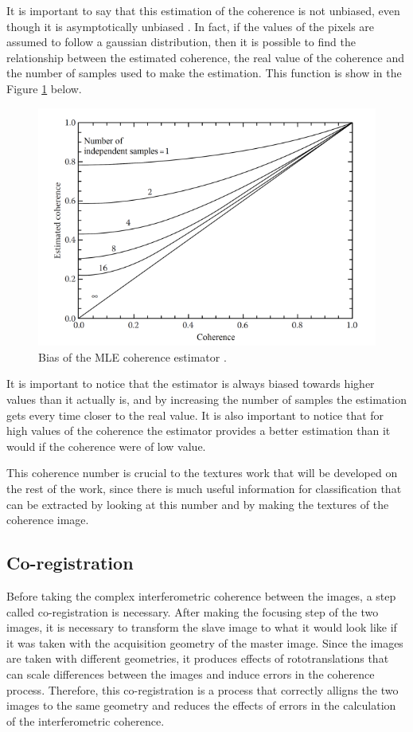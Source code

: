 It is important to say that this estimation of the coherence is not unbiased, even though it is asymptotically unbiased \cite{Bamler}. In fact, if the values of the pixels are assumed to follow a gaussian distribution, then it is possible to find the relationship between the estimated coherence, the real value of the coherence and the number of samples used to make the estimation. This function is show in the Figure \ref{fig:bias} below.

\begin{figure}[H]
    \centering
    \includegraphics[width=\linewidth]{Cap1/bias.png}
    \caption{Bias of the MLE coherence estimator \cite{Bamler}.}
    \label{fig:bias}
\end{figure}

It is important to notice that the estimator is always biased towards higher values than it actually is, and by increasing the number of samples the estimation gets every time closer to the real value. It is also important to notice that for high values of the coherence the estimator provides a better estimation than it would if the coherence were of low value. 

This coherence number is crucial to the textures work that will be developed on the rest of the work, since there is much useful information for classification that can be extracted by looking at this number and by making the textures of the coherence image.

\subsection{Co-registration}
Before taking the complex interferometric coherence between the images, a step called co-registration is necessary. After making the focusing step of the two images, it is necessary to transform the slave image to what it would look like if it was taken with the acquisition geometry of the master image. Since the images are taken with different geometries, it produces effects of rototranslations that can scale differences between the images and induce errors in the coherence process. Therefore, this co-registration is a process that correctly alligns the two images to the same geometry and reduces the effects of errors in the calculation of the interferometric coherence\cite{andreathesis}.

